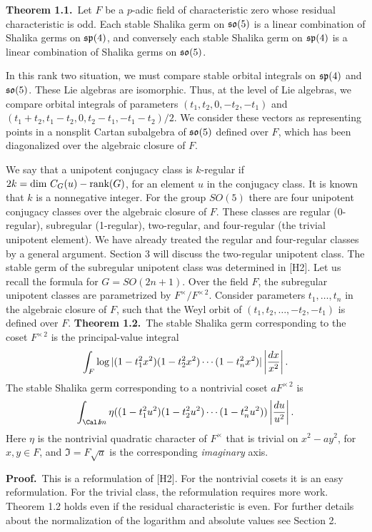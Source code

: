 \bigskip
\noindent
{\bf Theorem 1.1.}\   Let $F$ be a $p$-adic field of characteristic zero
whose residual characteristic is odd.  Each stable Shalika germ on $\so(5)$
is a linear combination of Shalika germs on $\sp(4)$, and conversely each
stable Shalika germ on $\sp(4)$ is a linear combination of Shalika germs
on $\so(5)$.

In this rank two situation,  we must compare stable orbital integrals
on $\sp(4)$ and $\so(5)$. These Lie algebras are
isomorphic.  Thus, at the level of Lie algebras, we compare
orbital integrals of parameters $(t_1,t_2,0,-t_2,-t_1)$ and
$(t_1+t_2,t_1-t_2,0,t_2-t_1,-t_1-t_2)/2$.  We consider these vectors
as representing points in a nonsplit Cartan
subalgebra of $\so(5)$ defined over $F$, which has been
diagonalized over the algebraic closure of $F$.

We say that a unipotent conjugacy class is $k$-regular if
$2k = \dim\,C_G(u) - \rank(G)$, for an element $u$ in the conjugacy
class.  It is known that $k$ is a nonnegative integer.   For the
group $SO(5)$ there are four unipotent conjugacy classes over the
algebraic closure of $F$.  These classes are regular (0-regular),
subregular (1-regular), two-regular, and four-regular (the trivial unipotent
element).  We have already treated the regular and four-regular classes
by a general argument.  
Section 3 will discuss the two-regular unipotent class.
The stable germ of the subregular unipotent class was determined
in [H2].  Let us recall the formula for $G=SO(2n+1)$.  Over the
field $F$, the subregular unipotent classes are parametrized by
$F^\times/F^{\times\,2}$.  
Consider parameters $t_1,\ldots, t_n$ in the algebraic closure
of $F$, such that the Weyl orbit of $(t_1,t_2,\ldots,-t_2,-t_1)$
is defined over $F$.
\bigskip
\noindent
{\bf Theorem 1.2.}\  The stable Shalika germ corresponding to the
coset $F^{\times\,2}$ is the principal-value integral
$$\int_F \log |(1- t_1^2 x^2)(1-t_2^2 x^2)\cdots (1-t_n^2 x^2)| 
     \left| 
     {dx\over x^2} \right |.$$
The stable Shalika germ corresponding to a nontrivial coset $a F^{\times\,2}$
is
$$\int_{\Im} \eta((1-t_1^2 u^2)(1-t_2^2 u^2)\cdots (1-t_n^2 u^2))
    \left| {du\over u^2} \right |.$$
Here $\eta$ is the nontrivial quadratic character of $F^\times$
that is trivial on $x^2-a y^2$, for $x,y\in F$,
and $\Im = F\sqrt{a}$ is the corresponding
{\it imaginary} axis.

\medskip
\noindent
{\bf Proof.}\  This is a  reformulation of [H2].  For the nontrivial
cosets it is an easy reformulation.  For the trivial class, the
reformulation requires more work.  Theorem 1.2 holds even if the
residual characteristic is even.  For further details about the
normalization of the logarithm and absolute values see Section 2.

